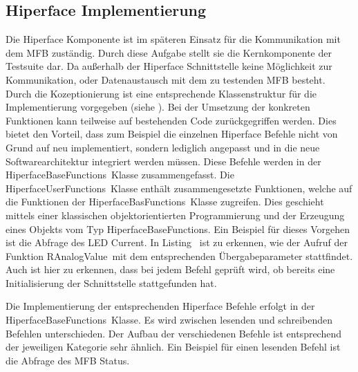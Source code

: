 	\subsection{Hiperface Implementierung}
	Die Hiperface Komponente ist im späteren Einsatz für die Kommunikation mit dem \ac{MFB} zuständig. Durch diese Aufgabe stellt sie die Kernkomponente der Testsuite dar. Da außerhalb der Hiperface Schnittstelle keine Möglichkeit zur Kommunikation, oder Datenaustausch mit dem zu testenden \ac{MFB} besteht. Durch die Kozeptionierung ist eine entsprechende Klassenstruktur für die Implementierung vorgegeben (siehe \dq {}\dq). Bei der Umsetzung der konkreten Funktionen kann teilweise auf bestehenden Code zurückgegriffen werden. Dies bietet den Vorteil, dass zum Beispiel die einzelnen Hiperface Befehle nicht von Grund auf neu implementiert, sondern lediglich angepasst und in die neue Softwarearchitektur integriert werden müssen. Diese Befehle werden in der \dq HiperfaceBaseFunctions\dq~Klasse zusammengefasst. Die \dq HiperfaceUserFunctions\dq~Klasse enthält zusammengesetzte Funktionen, welche auf die Funktionen der \dq HiperfaceBasFunctions\dq~Klasse zugreifen. Dies geschieht mittels einer klassischen objektorientierten Programmierung und der Erzeugung eines Objekts vom Typ \dq HiperfaceBaseFunctions\dq. Ein Beispiel für dieses Vorgehen ist die Abfrage des LED Current. In Listing \dq {}\dq~ist zu erkennen, wie der Aufruf der Funktion \dq RAnalogValue\dq~mit dem entsprechenden Übergabeparameter stattfindet. Auch ist hier zu erkennen, dass bei jedem Befehl geprüft wird, ob bereits eine Initialisierung der Schnittstelle stattgefunden hat.
\newline
\begin{center}

\begin{minipage}[h]{\textwidth}
	
\end{minipage}

\end{center}
Die Implementierung der entsprechenden Hiperface Befehle erfolgt in der \dq HiperfaceBaseFunctions\dq~Klasse. Es wird zwischen lesenden und schreibenden Befehlen unterschieden. Der Aufbau der verschiedenen Befehle ist entsprechend der jeweiligen Kategorie sehr ähnlich. Ein Beispiel für einen lesenden Befehl ist die Abfrage des \ac{MFB} Status.
\newline
